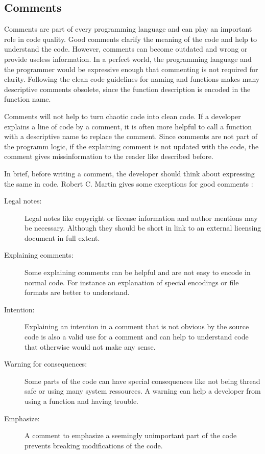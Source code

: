 \subsection{Comments}
Comments are part of every programming language and can play an important role in code quality. Good comments clarify the meaning of the code and help to understand the code. However, comments can become outdated and wrong or provide useless information. In a perfect world, the programming language and the programmer would be expressive enough that commenting is not required for clarity. Following the clean code guidelines for naming and functions makes many descriptive comments obsolete, since the function description is encoded in the function name.

Comments will not help to turn chaotic code into clean code. If a developer explains a line of code by a comment, it is often more helpful to call a function with a descriptive name to replace the comment. Since comments are not part of the programm logic, if the explaining comment is not updated with the code, the comment gives missinformation to the reader like described before.

In brief, before writing a comment, the developer should think about expressing the same in code. Robert C. Martin gives some exceptions for good comments \cite{martin_clean_2009}:

\begin{description}
    \item[Legal notes:] Legal notes like copyright or license information and author mentions may be necessary. Although they should be short in link to an external licensing document in full extent.
    \item[Explaining comments:] Some explaining comments can be helpful and are not easy to encode in normal code. For instance an explanation of special encodings or file formats are better to understand.
    \item[Intention:] Explaining an intention in a comment that is not obvious by the source code is also a valid use for a comment and can help to understand code that otherwise would not make any sense.
    \item[Warning for consequences:] Some parts of the code can have special consequences like not being thread safe or using many system ressources. A warning can help a developer from using a function and having trouble.
    \item[Emphasize:] A comment to emphasize a seemingly unimportant part of the code prevents breaking modifications of the code. 
\end{description}

